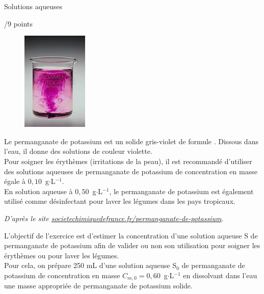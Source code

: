 \newpage
\setcounter{exercice}{0}
\begin{doc}{Solutions aqueuses \begin{Large}
    /9 points
\end{Large}}
\begin{figure}
\vspace{-1cm}
    \centering
      \includegraphics[scale=1.0]{Images/DS/Devoir_Commun/Permanganate.png}
  \end{figure}
\og Le permanganate de potassium est un solide gris-violet de formule . Dissous dans l’eau, il donne des solutions de couleur violette.\\
Pour soigner les érythèmes (irritations de la peau), il est recommandé d’utiliser des solutions aqueuses de permanganate de potassium de concentration en masse égale à $0,10$~g$\cdot$L$^{-1}$.\\
En solution aqueuse à $0,50$~g$\cdot$L$^{-1}$, le permanganate de potassium est également utilisé comme désinfectant pour laver les légumes dans les pays tropicaux.\fg
\begin{flushright}
    \textit{D’après le site \url{ societechimiquedefrance.fr/permanganate-de-potassium}}.
\end{flushright}

L’objectif de l’exercice est d’estimer la concentration d’une solution aqueuse S de permanganate de potassium afin de valider ou non son utilisation pour soigner les érythèmes ou pour laver les légumes.\\

Pour cela, on prépare 250 mL d’une solution aqueuse S$_0$ de permanganate de potassium de concentration en masse $C_{m,0} = 0,60$~g$\cdot$L$^{-1}$ en dissolvant dans l’eau une masse appropriée de permanganate de potassium solide.\\



\end{doc}
